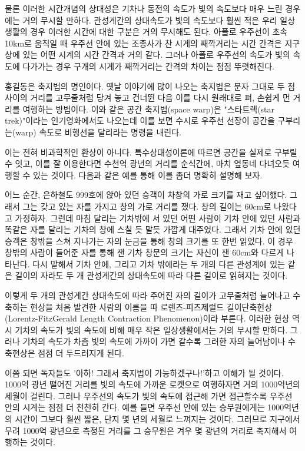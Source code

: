 물론 이러한 시간개념의 상대성은 기차나 동전의 속도가 빛의 속도보다 매우 느린 경우에는
거의 무시할 만하다. 관성계간의 상대속도가 빛의 속도보다 훨씬 적은 우리 일상생활의 경우
이러한 시간에 대한 구분은 거의 무시해도 된다. 아폴로 우주선이 초속 10km로 움직일 때
우주선 안에 있는 조종사가 찬 시계의 째깍거리는 시간 간격은 지구상에 있는 어떤 시계의
시간 간격과 거의 같다. 그러나 아폴로 우주선의 속도가 빛의 속도에 다가가는 경우 구개의
시계가 째깍거리는 간격의 차이는 점점 뚜렷해진다.

홍길동은 축지법의 명인이다. 옛날 이야기에 많이 나오는 축지법은 문자 그대로 두 점 사이의
거리를 고무줄처럼 당겨 놓고 건너뛴 다음 이를 다시 원래대로 펴, 손쉽게 먼 거리를 여행하는
방법이다. 이와 같은 공간 축지법(space warp)은 "스타트렉(star trek)"이라는 인기영화에서도
나오는데 이를 보면 수시로 우주선 선장이 공간을 구부리는(warp) 속도로 비행선을 달리라는
명령을 내린다.

이는 전혀 비과학적인 환상이 아니다. 특수상대성이론에 따르면 공간을 실제로 구부릴 수
잇고, 이를 잘 이용한다면 수천억 광년의 거리를 순식간에, 마치 옆동네 다녀오듯 여행할 수
있는 것이다. 다음과 같은 예를 통해 이를 좀더 명확히 설명해 보자.

어느 순간, 은하철도 999호에 앉아 있던 승객이 차창의 가로 크기를 재고 싶어했다. 그래서
그는 갖고 있는 자를 가지고 창의 가로 거리를 쟀다. 창의 길이는 60cm로 나왔다고 가정하자.
그런데 마침 달리는 기차밖에 서 있던 어떤 사람이 기차 안에 있던 사람과 똑같은 자를 달리는
기차의 창에 스칠 듯 말듯 가깝게 대주었다. 그래서 기차 안에 있던 승객은 창밖을 스쳐
지나가는 자의 눈금을 통해 창의 크기를 또 한번 읽었다. 이 경우 창밖의 사람이 들어준 자를
통해 잰 기차 창문의 크기는 자신이 잰 60cm와 다르게 나타난다. 다시 말해서 기차 안에,
그리고 기차 밖에라는 두 개의 다른 관성계에 있는 같은 길이의 자라도 두 개 관성계간의
상대속도에 따라 다른 길이로 읽혀지는 것이다.

이렇게 두 개의 관성계간 상대속도에 따라 주어진 자의 길이가 고무줄처럼 늘어나고 수축하는
현상을 처음 발견한 사람의 이름을 따 로렌츠-피츠제럴드 길이단축현상(Lorentz-FitzGerald
Length Contraction Phenomenon)이라 부른다. 이러한 현상 역시 기차의 속도가 빛의 속도에
비해 매우 작은 일상생활에서는 거의 무시할 만하다. 그러나 기차의 속도가 차츰 빛의 속도에
가까이 가면 갈수록 그러한 자의 늘어남이나 수축현상은 점점 더 두드러지게 된다.

이쯤 되면 독자들도 '아하! 그래서 축지법이 가능하겠구나!'하고 이해가 될 것이다. 1000억
광년 떨어진 거리를 빛의 속도에 가까운 로켓으로 여행하자면 거의 1000억년의 세월이 걸린다.
그러나 우주선의 속도가 빛의 속도에 접근해 가면 접근할수록 우주선 안의 시계는 점점 더
천천히 간다. 예를 들면 우주선 안에 있는 승무원에게는 1000억년의 시간이 그보다 훨씬 짧은,
단지 몇 년의 세월로 느껴지는 것이다. 그러므로 지구에서 무려 1000억 광년으로 측정된
거리를 그 승무원은 겨우 몇 광년의 거리로 축지해서 여행하는 것이다.

